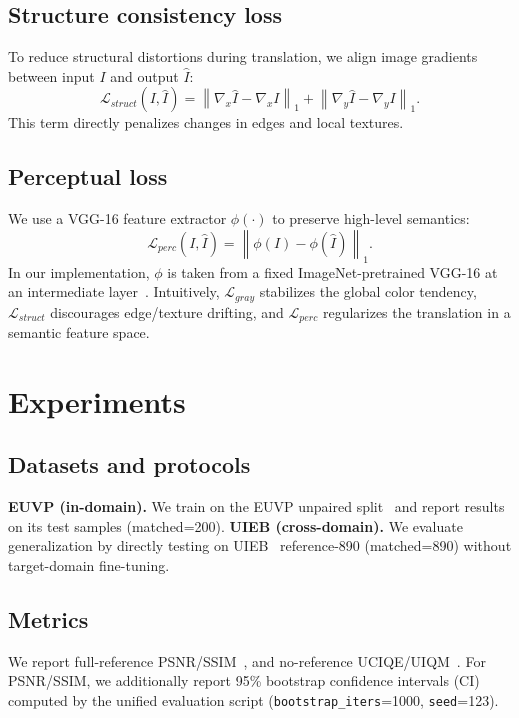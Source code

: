 \documentclass{article}
\begin{document}
\subsection{Structure consistency loss}
To reduce structural distortions during translation, we align image gradients between input $I$ and output $\hat{I}$:
\begin{equation}
\mathcal{L}_{struct}(I,\hat{I})=\left\|\nabla_x \hat{I}-\nabla_x I\right\|_1+\left\|\nabla_y \hat{I}-\nabla_y I\right\|_1.
\end{equation}
This term directly penalizes changes in edges and local textures.

\subsection{Perceptual loss}
We use a VGG-16 feature extractor $\phi(\cdot)$ to preserve high-level semantics:
\begin{equation}
\mathcal{L}_{perc}(I,\hat{I})=\left\|\phi(I)-\phi(\hat{I})\right\|_1.
\end{equation}
In our implementation, $\phi$ is taken from a fixed ImageNet-pretrained VGG-16 at an intermediate layer~\cite{johnson2016perceptual,simonyan2015vgg}.
Intuitively, $\mathcal{L}_{gray}$ stabilizes the global color tendency, $\mathcal{L}_{struct}$ discourages edge/texture drifting, and $\mathcal{L}_{perc}$ regularizes the translation in a semantic feature space.

\section{Experiments}
\subsection{Datasets and protocols}
\textbf{EUVP (in-domain).} We train on the EUVP unpaired split~\cite{islam2020funiegan} and report results on its test samples (matched=200).
\textbf{UIEB (cross-domain).} We evaluate generalization by directly testing on UIEB~\cite{li2020uieb} reference-890 (matched=890) without target-domain fine-tuning.

\subsection{Metrics}
We report full-reference PSNR/SSIM~\cite{wang2004ssim}, and no-reference UCIQE/UIQM~\cite{yang2015uciqe,panetta2016uiqm}.
For PSNR/SSIM, we additionally report 95\% bootstrap confidence intervals (CI) computed by the unified evaluation script (\texttt{bootstrap\_iters}=1000, \texttt{seed}=123).
\end{document}
